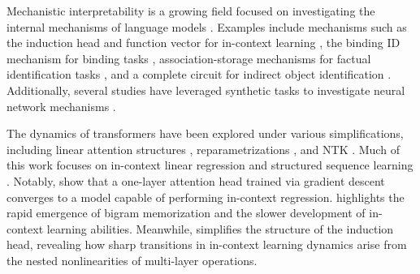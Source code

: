 Mechanistic interpretability is a growing field focused on investigating the internal mechanisms of language models \citep{elhage2021mathematical, geva2023dissecting, meng2022locating, nanda2023progress, olsson2022context, bietti2024birth, wang2022interpretability, feng2023language, todd2023function}. Examples include mechanisms such as the induction head and function vector for in-context learning \citep{elhage2021mathematical, olsson2022context, todd2023function, bietti2024birth}, the binding ID mechanism for binding tasks \citep{feng2023language}, association-storage mechanisms for factual identification tasks \citep{meng2022locating}, and a complete circuit for indirect object identification \citet{wang2022interpretability}. Additionally, several studies have leveraged synthetic tasks to investigate neural network mechanisms \citet{charton2022my, liu2022towards, nanda2023progress, allen2023physics, zhu2023physics, guo2023transformers, zhang2022unveiling, lin2023transformers, guo2024active}. 

The dynamics of transformers have been explored under various simplifications, including linear attention structures \citep{zhang2024trained,ahn2024transformers}, reparametrizations \citep{tian2023joma,zhu2024towards}, and NTK \citep{deora2023optimization}. Much of this work focuses on in-context linear regression \citep{ahn2023linear,wu2023many,zhang2024context} and structured sequence learning \citep{bietti2024birth,nichani2024transformers,tian2023scan, guo2024active}. Notably, \citet{zhang2024trained, huang2023context, kim2024transformers} show that a one-layer attention head trained via gradient descent converges to a model capable of performing in-context regression. \citet{bietti2024birth} highlights the rapid emergence of bigram memorization and the slower development of in-context learning abilities. Meanwhile, \citet{reddy2023mechanistic} simplifies the structure of the induction head, revealing how sharp transitions in in-context learning dynamics arise from the nested nonlinearities of multi-layer operations. 



